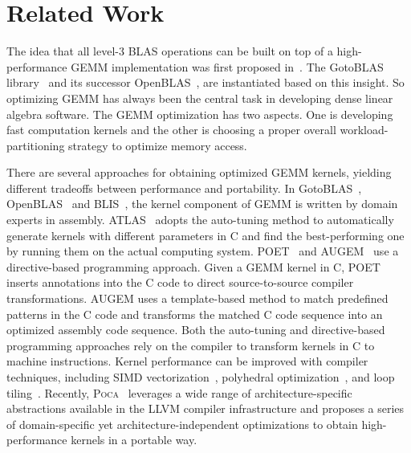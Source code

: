 \section{Related Work}\label{sec:related}
The idea that all level-3 BLAS operations can be built 
on top of 
a high-performance GEMM implementation was first proposed
in~\cite{gemmbased1,gemmbased2}.
The GotoBLAS library~\cite{gotoblas} and its successor OpenBLAS~\cite{openblas},
are instantiated based on this insight.
So optimizing GEMM has always been the central task in developing
dense linear algebra software.
The GEMM optimization has two aspects.
One is developing fast computation kernels and
the other is choosing a proper overall workload-partitioning  strategy
to optimize memory access.


There are several approaches for obtaining optimized GEMM kernels,
yielding different tradeoffs between performance and portability.
In GotoBLAS~\cite{gotoblas}, OpenBLAS~\cite{openblas} and BLIS~\cite{blis},
the kernel component of GEMM is written by domain experts in assembly.
ATLAS~\cite{atlas} adopts the auto-tuning method to
automatically generate kernels with different parameters
in C and find the best-performing one by running them
on the actual computing system.
POET~\cite{poet,poetcgo,poetmicro} and AUGEM~\cite{augem} use a 
directive-based programming approach.
Given a GEMM kernel in C, POET inserts annotations into
the C code to direct source-to-source compiler transformations.
AUGEM uses a template-based method to match
predefined patterns in the C code and transforms the matched
C code sequence into an optimized assembly code sequence.
Both the auto-tuning and directive-based programming approaches
rely on the compiler to transform kernels in C to machine instructions.
Kernel performance can be improved with compiler techniques,
including SIMD vectorization~\cite{Larsen:2000,Zhou:2016,Zhou:2016b,
  Eichenberger2004,GCCSLP2007},
polyhedral optimization~\cite{Bondhugula2008A,Kong:2013}, 
and loop tiling~\cite{Lam1991,Spampinato:2014,Xue00}.
Recently,
\textsc{Poca}~\cite{poca} leverages a wide range of architecture-specific
abstractions available in the LLVM compiler infrastructure
and proposes a series of domain-specific yet architecture-independent optimizations
to obtain high-performance kernels in a portable way.

